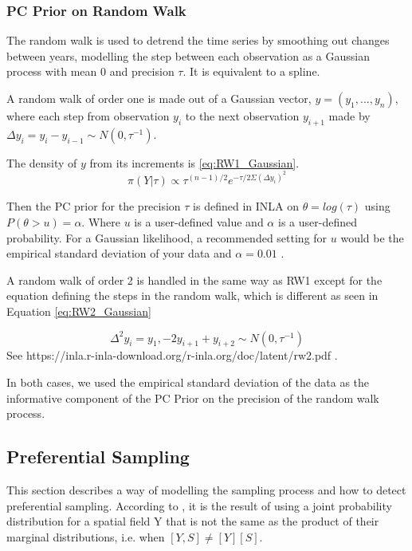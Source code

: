 \documentclass{article}
\begin{document}
\subsubsection*{PC Prior on Random Walk}
\label{subsubsec:pconranwalk}
The random walk is used to detrend the time series by smoothing out changes between years, modelling the step between each observation as a Gaussian process with mean 0 and precision $\tau$.  It is equivalent to a spline.

A random walk of order one is made out of a Gaussian vector, 
$y = (y_1, ..., y_n)$,  where each step from observation $y_i$ to the next observation $y_{i+1}$ made by $\Delta y_i = y_i - y_{i-1} \sim N(0, \tau^{-1})$.  

The density of $y$ from its increments is \ref{eq:RW1_Gaussian}.
\begin{equation} \label{eq:RW1_Gaussian}
    \pi (Y|\tau) \propto \tau^{(n-1)/2} e^{-\tau/2 \Sigma (\Delta y_i)^2} 
\end{equation}


Then the \ac{PC} prior for the precision $\tau$ is defined in \ac{INLA} on $\theta = log(\tau)$ using $P(\theta > u) = \alpha$.  Where $u$ is a user-defined value and $\alpha$ is a user-defined probability.  For a Gaussian likelihood, a recommended setting for $u$ would be the empirical standard deviation of your data and $\alpha =0.01$  \citep{gomezGitBook}.


A random walk of order 2 is handled in the same way as RW1 except for the equation defining the steps in the random walk, which is different as seen in Equation \ref{eq:RW2_Gaussian}

\begin{equation} \label{eq:RW2_Gaussian}
    \Delta^2 y_i = y_1, - 2y_{i+1} + y_{i+2} \sim N(0,\tau^{-1})
\end{equation}
See 
https://inla.r-inla-download.org/r-inla.org/doc/latent/rw2.pdf
.

In both cases, we used the empirical standard deviation of the data as the informative component of the PC Prior on the precision of the random walk process.










\subsection{Preferential Sampling} \label{subsec:PreferentialSampling}
This section describes a way of modelling the sampling process and how to detect preferential sampling. 
According to 
\citet{diggle:07}, it is the result of using a joint probability distribution for a spatial field \gls{Y} that is not the same as the product of their marginal distributions, i.e. when $[Y, S] \neq [Y][S]$.  
\end{document}
